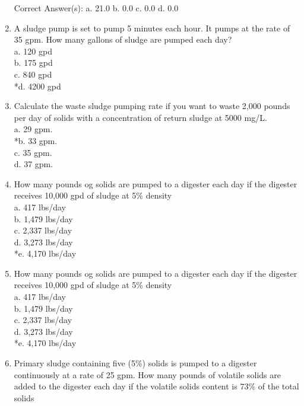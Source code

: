 \documentclass{article}
\begin{document}
\begin{enumerate}
Correct Answer(s):
a. 21.0
b. 0.0
c. 0.0
d. 0.0 \\

\item  A sludge pump is set to pump 5 minutes each hour. It pumps at the rate of 35 gpm. How many gallons of sludge are pumped each day? \\

a. 120 gpd \\
b. 175 gpd \\
c. 840 gpd \\
*d. 4200 gpd \\

\item  Calculate the waste sludge pumping rate if you want to waste 2,000 pounds per day of solids with a concentration of return sludge at 5000 mg/L. \\

a. 29 gpm. \\
*b. 33 gpm. \\
c. 35 gpm. \\
d. 37 gpm. \\

\item  How many pounds og solids are pumped to a digester each day if the digester receives 10,000 gpd of sludge at 5\% density \\

a. 417 lbs/day \\
b. 1,479 lbs/day \\
c. 2,337 lbs/day \\
d. 3,273 lbs/day \\
*e. 4,170 lbs/day \\

\item  How many pounds og solids are pumped to a digester each day if the digester receives 10,000 gpd of sludge at 5\% density \\

a. 417 lbs/day \\
b. 1,479 lbs/day \\
c. 2,337 lbs/day \\
d. 3,273 lbs/day \\
*e. 4,170 lbs/day \\

\item  Primary sludge containing five (5\%) solids is pumped to a digester continuously at a rate of 25 gpm.  How many pounds of volatile solids are added to the digester each day if the volatile solids content is 73\% of the total solids \\


\end{enumerate}
\end{document}
